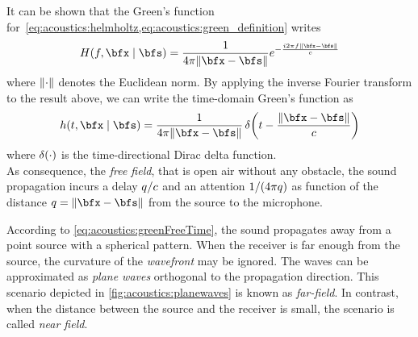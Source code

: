 It can be shown  that the Green's function for~\cref{eq:acoustics:helmholtz,eq:acoustics:green_definition} writes
\begin{equation}
    \label{eq:acoustics:greenFreeFreq}
    H(f, \positionMicrophone \mid \positionSource) = \frac{1}{4 \pi \norm{\positionMicrophone - \positionSource}} \cste^{- \frac{\csti 2 \pi f \norm{\positionMicrophone - \positionSource}}{\speedOfSound}}
\end{equation}
where $\norm{\cdot}$ denotes the Euclidean norm.
By applying the inverse Fourier transform to the result above, we can write the time-domain Green's function as
\begin{equation}
    \label{eq:acoustics:greenFreeTime}
    h(t, \positionMicrophone \mid \positionSource) =
        \frac{1}{4 \pi \norm{\positionMicrophone - \positionSource}}
        \diracOf{t - \frac{\norm{\positionMicrophone - \positionSource}}{\speedOfSound}}
\end{equation}
where $\diracOf{\cdot}$ is the time-directional Dirac delta function.
\\As consequence, the \textit{free field}, that is open air without any obstacle, the  sound propagation incurs a delay $q / c$
and an attention $1 / (4 \pi q)$ as function of the distance
$ \distMicSrc = \norm{\positionMicrophone - \positionSource}$ from the source to the microphone.

According to \cref{eq:acoustics:greenFreeTime}, the sound propagates away from a point source with a spherical pattern.
When the receiver is far enough from the source, the curvature of the \textit{wavefront} may be ignored.
The waves can be approximated as \textit{plane waves} orthogonal to the propagation direction.
This scenario depicted in \cref{fig:acoustics:planewaves} is known as \textit{far-field}.
In contrast, when the distance between the source and the receiver is small, the scenario is called \textit{near field}.

